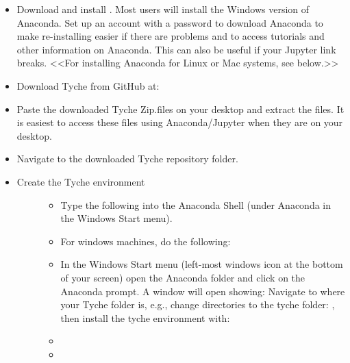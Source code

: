 \documentclass[letterpaper,10pt,english]{sphinxmanual}
\begin{document}
\begin{itemize}
\item {} 
Download and install  . Most users will install the Windows version of Anaconda.  Set up an account with a password to download Anaconda to make re-installing easier if there are problems and to access tutorials and other information on Anaconda.  This can also be useful if your Jupyter link breaks.  \textless{}\textless{}For installing Anaconda for Linux or Mac systems, see below.\textgreater{}\textgreater{}

\item {} 
Download Tyche from GitHub at: 

\item {} 
Paste the downloaded Tyche Zip.files on your desktop and extract the files.  It is easiest to access these files using Anaconda/Jupyter when they are on your desktop.

\item {} 
Navigate to the downloaded Tyche repository folder.

\item {} \begin{description}
\item[{Create the Tyche environment}] \leavevmode\begin{itemize}
\item {} 
Type the following into the Anaconda Shell (under Anaconda in the Windows Start menu).

\item {} 
For windows machines, do the following:

\item {} 
In the Windows Start menu (left-most windows icon at the bottom of your screen) open the Anaconda folder and click on the Anaconda prompt.  A window will open showing:    Navigate to where your Tyche folder is, e.g., change directories to the tyche folder:  , then install the tyche environment with:

\item {} 

\item {} 


\end{itemize}
\end{description}
\end{itemize}
\end{document}
